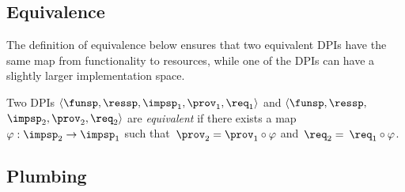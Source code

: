 \subsection{Equivalence}

The definition of equivalence below ensures that two equivalent DPIs
have the same map from functionality to resources, while one of the
DPIs can have a slightly larger implementation space.
\begin{definition}
    Two DPIs $\left\langle \funsp,\ressp,\impsp_{1},\prov_{1},\req_{1}\right\rangle $
    and $\langle\funsp,\ressp,$ $\impsp_{2},\prov_{2},\req_{2}\rangle$
    are \emph{equivalent} if there exists a map~$\varphi:\impsp_{2}\rightarrow\impsp_{1}$
    such that~$\prov_{2}=\prov_{1}\circ\varphi$ and~$\req_{2}=$ $\req_{1}\circ\varphi$.
\end{definition}

\subsection{Plumbing}

